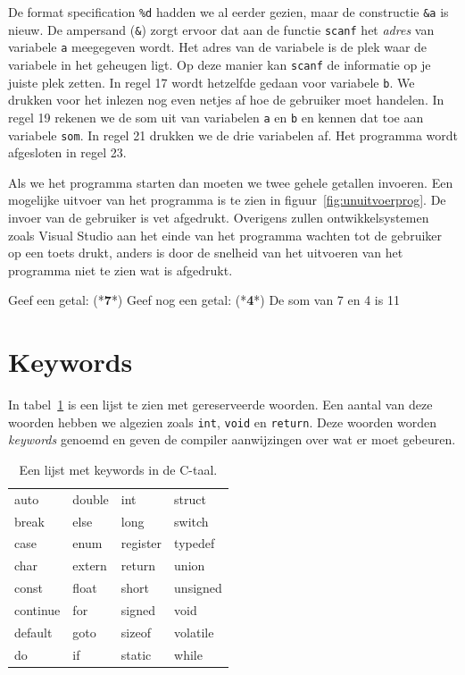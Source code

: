 De format specification \texttt{\%d} hadden we al eerder gezien, maar de constructie \texttt{\&a} is nieuw. De ampersand (\texttt{\&}) zorgt ervoor dat aan de functie \texttt{scanf} het \textsl{adres} van variabele \texttt{a} meegegeven wordt. Het adres van de variabele is de plek waar de variabele in het geheugen ligt. Op deze manier kan \texttt{scanf} de informatie op je juiste plek zetten. In regel 17 wordt hetzelfde gedaan voor variabele \texttt{b}. We drukken voor het inlezen nog even netjes af hoe de gebruiker moet handelen. In regel 19 rekenen we de som uit van variabelen \texttt{a} en \texttt{b} en kennen dat toe aan variabele \texttt{som}. In regel 21 drukken we de drie variabelen af. Het programma wordt afgesloten in regel 23.

Als we het programma starten dan moeten we twee gehele getallen invoeren. Een mogelijke uitvoer van het programma is te zien in figuur~\ref{fig:unuitvoerprog}. De invoer van de gebruiker is vet afgedrukt.
Overigens zullen ontwikkelsystemen zoals Visual Studio aan het einde van het programma wachten tot de gebruiker op een toets drukt, anders is door de snelheid van het uitvoeren van het programma niet te zien wat is afgedrukt.

\begin{dosbox}[title=Uitvoer van het programma in listing~\ref{cod:unscanfprogramma}.,label=fig:unuitvoerprog]
Geef een getal: (*\textbf{7}*)
Geef nog een getal: (*\textbf{4}*)
De som van 7 en 4 is 11
\end{dosbox}

\section{Keywords}

In tabel~\ref{tab:unkeywords} is een lijst te zien met gereserveerde woorden. Een aantal van deze woorden hebben we algezien zoals \texttt{int}, \texttt{void} en \texttt{return}. Deze woorden worden \textsl{keywords} genoemd en geven de compiler aanwijzingen over wat er moet gebeuren.

\begin{table}[!ht]
\caption{Een lijst met keywords in de C-taal.}
\label{tab:unkeywords}
\centering\ttfamily
\begin{tabular}{p{2.5cm}p{2.5cm}p{2.5cm}p{2.5cm}}
\toprule
auto &  double &  int & struct \\
break & else  & long  &  switch \\
case & enum & register & typedef \\
char & extern & return & union \\
const & float & short &  unsigned \\
continue & for & signed & void \\
default & goto & sizeof & volatile \\
do & if & static & while \\
\bottomrule
\end{tabular}
\end{table}


